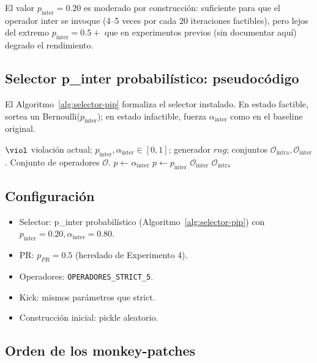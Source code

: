 El valor $p_{\text{inter}} = 0.20$ es moderado por construcción:
suficiente para que el operador inter se invoque (4--5 veces por cada
20 iteraciones factibles), pero lejos del extremo $p_{\text{inter}} =
0.5+$ que en experimentos previos (sin documentar aquí) degrado el
rendimiento.

\subsection{Selector p\_inter probabilístico: pseudocódigo}

El Algoritmo~\ref{alg:selector-pip} formaliza el selector instalado.
En estado factible, sortea un Bernoulli($p_{\text{inter}}$); en estado
infactible, fuerza $\alpha_{\text{inter}}$ como en el baseline original.

\begin{algorithm}[h]
\caption{Selector p\_inter probabilístico.}
\label{alg:selector-pip}
\begin{algorithmic}[1]
\Require $\viol$ violación actual; $p_{\text{inter}}, \alpha_{\text{inter}} \in [0,1]$;
  generador $rng$; conjuntos $\mathcal{O}_{\text{intra}}, \mathcal{O}_{\text{inter}}$.
\Ensure Conjunto de operadores $\mathcal{O}$.
  \State $p \gets \alpha_{\text{inter}}$
\Else
  \State $p \gets p_{\text{inter}}$
\EndIf
{}
  \State \Return $\mathcal{O}_{\text{inter}}$
\Else
  \State \Return $\mathcal{O}_{\text{intra}}$
\EndIf
\end{algorithmic}
\end{algorithm}

\subsection{Configuración}

\begin{itemize}
\item Selector: p\_inter probabilístico (Algoritmo~\ref{alg:selector-pip})
  con $p_{\text{inter}} = 0.20, \alpha_{\text{inter}} = 0.80$.
\item PR: $p_{PR} = 0.5$ (heredado de Experimento 4).
\item Operadores: \texttt{OPERADORES\_STRICT\_5}.
\item Kick: mismos parámetros que strict.
\item Construcción inicial: pickle aleatorio.
\end{itemize}

\subsection{Orden de los monkey-patches}

